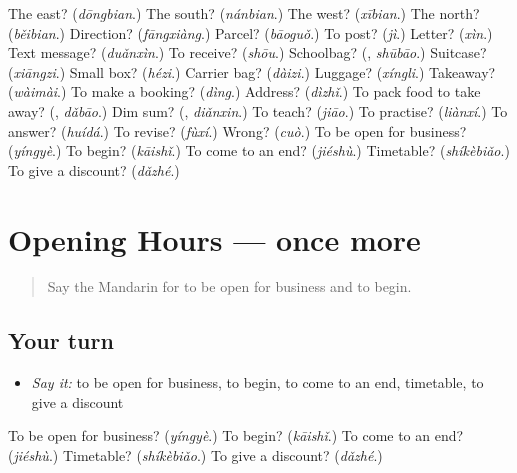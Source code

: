 \begin{tcolorbox}[breakable,colback=teal!4,colframe=teal!35!black,title={Before you move on}]
The east? (\emph{dōngbian}.) The south? (\emph{nánbian}.) The west? (\emph{xībian}.) The north? (\emph{běibian}.) Direction? (\emph{fāngxiàng}.) Parcel? (\emph{bāoguǒ}.) To post? (\emph{jì}.) Letter? (\emph{xìn}.) Text message? (\emph{duǎnxìn}.) To receive? (\emph{shōu}.) Schoolbag? (\textbf{}, \emph{shūbāo}.) Suitcase? (\emph{xiāngzi}.) Small box? (\emph{hézi}.) Carrier bag? (\emph{dàizi}.) Luggage? (\emph{xíngli}.) Takeaway? (\emph{wàimài}.) To make a booking? (\emph{dìng}.) Address? (\emph{dìzhǐ}.) To pack food to take away? (\textbf{}, \emph{dǎbāo}.) Dim sum? (\textbf{}, \emph{diǎnxin}.) To teach? (\emph{jiāo}.) To practise? (\emph{liànxí}.) To answer? (\emph{huídá}.) To revise? (\emph{fùxí}.) Wrong? (\emph{cuò}.) To be open for business? (\emph{yíngyè}.) To begin? (\emph{kāishǐ}.) To come to an end? (\emph{jiéshù}.) Timetable? (\emph{shíkèbiǎo}.) To give a discount? (\emph{dǎzhé}.)
\end{tcolorbox}
\section[(dialogue)]{Opening Hours — once more}

\label{lesson:ZH-R122-review-final-122}



\begin{quote}
Say the Mandarin for to be open for business and to begin.
\end{quote}

\subsection*{Your turn}
\begin{itemize}
\raggedright
  \item \emph{Say it:} to be open for business, to begin, to come to an end, timetable, to give a discount
\end{itemize}

\begin{tcolorbox}[breakable,colback=teal!4,colframe=teal!35!black,title={Before you move on}]
To be open for business? (\emph{yíngyè}.) To begin? (\emph{kāishǐ}.) To come to an end? (\emph{jiéshù}.) Timetable? (\emph{shíkèbiǎo}.) To give a discount? (\emph{dǎzhé}.)
\end{tcolorbox}
